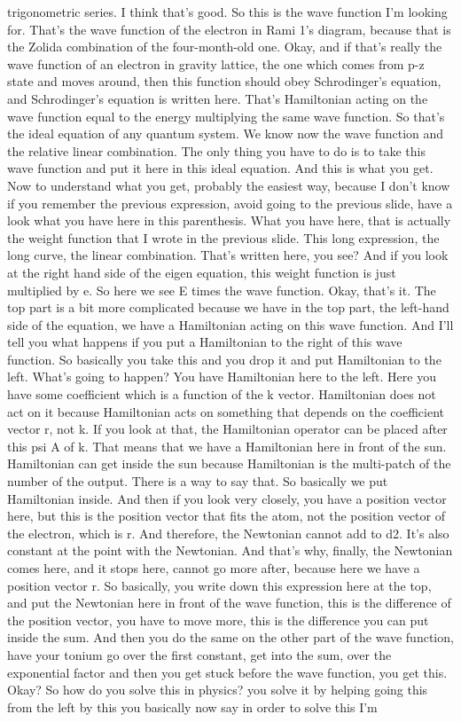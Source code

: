trigonometric series. I think that's good. So this is the wave function I'm looking for. That's the wave function of the electron in Rami 1's diagram, because that is the Zolida combination of the four-month-old one.
Okay, and if that's really the wave function of an electron in gravity lattice, the one which comes from p-z state and moves around, then this function should obey Schrodinger's equation, and Schrodinger's equation is written here. That's Hamiltonian acting on the wave function equal to the energy multiplying the same wave function. So that's the ideal equation of any quantum system. We know now the wave function and the relative linear combination. The only thing you have to do is to take this wave function and put it here in this ideal equation. And this is what you get. Now to understand what you get, probably the easiest way, because I don't know if you remember the previous expression, avoid going to the previous slide, have a look what you have here in this parenthesis. What you have here, that is actually the weight function that I wrote in the previous slide. This long expression, the long curve, the linear combination. That's written here, you see? And if you look at the right hand side of the eigen equation, this weight function is just multiplied by e. So here we see E times the wave function. Okay, that's it. The top part is a bit more complicated because we have in the top part, the left-hand side of the equation, we have a Hamiltonian acting on this wave function. And I'll tell you what happens if you put a Hamiltonian to the right of this wave function. So basically you take this and you drop it and put Hamiltonian to the left. What's going to happen? You have Hamiltonian here to the left. Here you have some coefficient which is a function of the k vector. Hamiltonian does not act on it because Hamiltonian acts on something that depends on the coefficient vector r, not k. If you look at that, the Hamiltonian operator can be placed after this psi A of k. That means that we have a Hamiltonian here in front of the sun. Hamiltonian can get inside the sun because Hamiltonian is the multi-patch of the number of the output. There is a way to say that. So basically we put Hamiltonian inside. And then if you look very closely, you have a position vector here, but this is the position vector that fits the atom, not the position vector of the electron, which is r. And therefore, the Newtonian cannot add to d2. It's also constant at the point with the Newtonian. And that's why, finally, the Newtonian comes here, and it stops here, cannot go more after, because here we have a position vector r. So basically, you write down this expression here at the top, and put the Newtonian here in front of the wave function, this is the difference of the position vector, you have to move more, this is the difference you can put inside the sum. And then you do the same on the other part of the wave function, have your tonium go over the first constant, get into the sum, over the exponential factor and then you get stuck before the wave function, you get this. Okay? So how do you solve this in physics? you solve it by helping going this from the left by this you basically now say in order to solve this I'm 